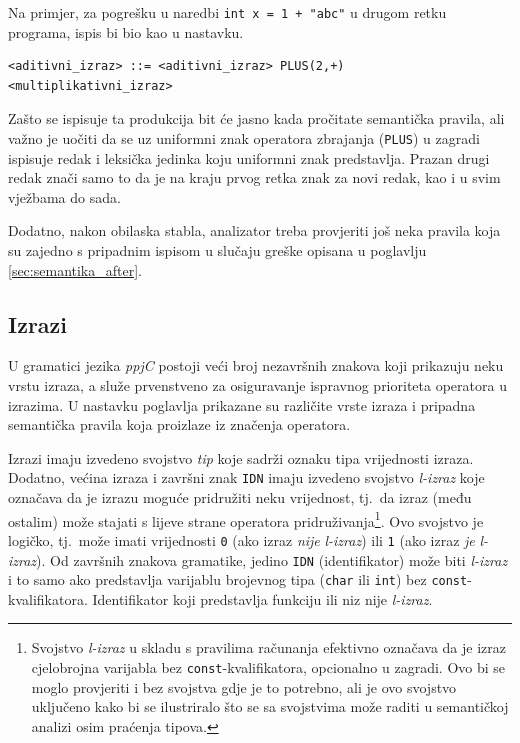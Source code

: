 \documentclass[times, 12pt, utf8]{book}
\begin{document}
Na primjer, za pogrešku u naredbi \verb|int x = 1 + "abc"| u drugom retku programa, ispis bi bio kao u nastavku.

\begin{lstlisting}[caption={Primjer ispisa.},label=lst:semantika_ispis]
<aditivni_izraz> ::= <aditivni_izraz> PLUS(2,+) <multiplikativni_izraz>

\end{lstlisting}

Zašto se ispisuje ta produkcija bit će jasno kada pročitate semantička pravila, ali važno je uočiti da se uz uniformni znak operatora zbrajanja (\verb|PLUS|) u zagradi ispisuje redak i leksička jedinka koju uniformni znak predstavlja.
Prazan drugi redak znači samo to da je na kraju prvog retka znak za novi redak, kao i u svim vježbama do sada.

Dodatno, nakon obilaska stabla, analizator treba provjeriti još neka pravila koja su zajedno s pripadnim ispisom u slučaju greške opisana u poglavlju \ref{sec:semantika_after}.

\subsection{Izrazi}
U gramatici jezika \emph{ppjC} postoji veći broj nezavršnih znakova koji prikazuju neku vrstu izraza, a služe prvenstveno za osiguravanje ispravnog prioriteta operatora u izrazima.
U nastavku poglavlja prikazane su različite vrste izraza i pripadna semantička pravila koja proizlaze iz značenja operatora.

Izrazi imaju izvedeno svojstvo \emph{tip} koje sadrži oznaku tipa vrijednosti izraza.
Dodatno, većina izraza i završni znak \verb|IDN| imaju izvedeno svojstvo \emph{l-izraz} koje označava da je izrazu moguće pridružiti neku vrijednost, tj.~da izraz (među ostalim) može stajati s lijeve strane operatora pridruživanja\footnote{Svojstvo \emph{l-izraz} u skladu s pravilima računanja efektivno označava da je izraz cjelobrojna varijabla bez \texttt{const}-kvalifikatora, opcionalno u zagradi. Ovo bi se moglo provjeriti i bez svojstva gdje je to potrebno, ali je ovo svojstvo uključeno kako bi se ilustriralo što se sa svojstvima može raditi u semantičkoj analizi osim praćenja tipova.}.
Ovo svojstvo je logičko, tj.~može imati vrijednosti \verb|0| (ako izraz \emph{nije} \emph{l-izraz}) ili \verb|1| (ako izraz \emph{je} \emph{l-izraz}).
Od završnih znakova gramatike, jedino \verb|IDN| (identifikator) može biti \emph{l-izraz} i to samo ako predstavlja varijablu brojevnog tipa (\verb|char| ili \verb|int|) bez \verb|const|-kvalifikatora.
Identifikator koji predstavlja funkciju ili niz nije \emph{l-izraz}.
\end{document}

